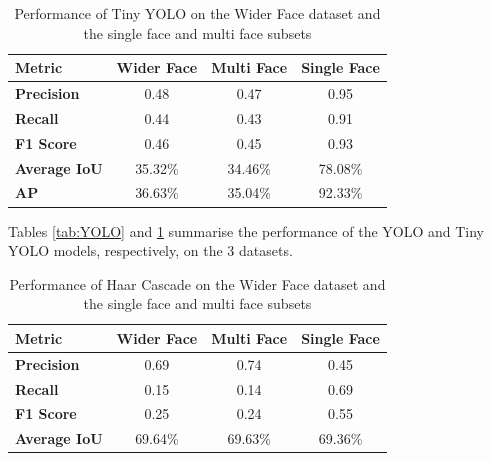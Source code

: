\begin{table}[h!]
\centering{}
\caption{Performance of Tiny YOLO on the Wider Face dataset and the single face and multi face subsets}
\begin{tabular}{|l|c|c|c|}
\hline
\textbf{Metric}      & \textbf{Wider Face} & \textbf{Multi Face}  & \textbf{Single Face} \\ \hline
\textbf{Precision}   & 0.48        & 0.47            & 0.95                 \\ \hline
\textbf{Recall}      & 0.44        & 0.43            & 0.91                 \\ \hline
\textbf{F1 Score}    & 0.46        & 0.45            & 0.93                 \\ \hline
\textbf{Average IoU} & 35.32\%     & 34.46\%            & 78.08\%              \\ \hline
\textbf{AP}          & 36.63\%     & 35.04\%             & 92.33\%              \\ \hline
\end{tabular}

\label{tab:TINYYOLO}
\end{table}

Tables \ref{tab:YOLO} and \ref{tab:TINYYOLO} summarise the performance of the YOLO and Tiny YOLO models, respectively, on the 3 datasets.

\begin{table}[h!]
\centering{}
\caption{Performance of Haar Cascade on the Wider Face dataset and the single face and multi face subsets}
\begin{tabular}{|l|c|c|c|}
\hline
\textbf{Metric}      & \textbf{Wider Face} & \textbf{Multi Face}  & \textbf{Single Face} \\ \hline
\textbf{Precision}   & 0.69      &  0.74           & 0.45               \\ \hline
\textbf{Recall}      & 0.15      &  0.14           & 0.69               \\ \hline
\textbf{F1 Score}    & 0.25      &  0.24           & 0.55               \\ \hline
\textbf{Average IoU} & 69.64\%     &  69.63\%           & 69.36\%              \\ \hline
\end{tabular}
\label{tab:HAAR}
\end{table}

